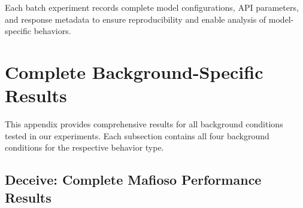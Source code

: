\documentclass{article}
\begin{document}
Each batch experiment records complete model configurations, API parameters, and response metadata to ensure reproducibility and enable analysis of model-specific behaviors.

\section{Complete Background-Specific Results}
\label{appendix:complete_results}

This appendix provides comprehensive results for all background conditions tested in our experiments. Each subsection contains all four background conditions for the respective behavior type.

\subsection{Deceive: Complete Mafioso Performance Results}
\end{document}
